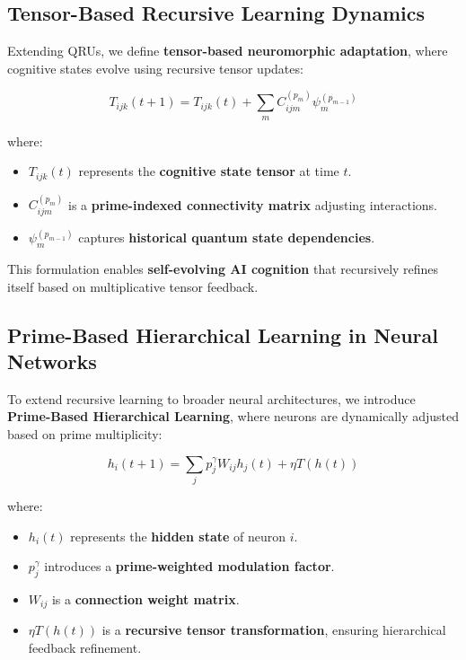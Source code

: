 \documentclass{article}
\theoremstyle{plain}
\theoremstyle{plain}
\theoremstyle{definition}
\theoremstyle{remark}
\begin{document}
\subsection{Tensor-Based Recursive Learning Dynamics}

Extending QRUs, we define \textbf{tensor-based neuromorphic adaptation}, where cognitive states evolve using recursive tensor updates:

\begin{equation}
T_{ijk}(t+1) = T_{ijk}(t) + \sum_{m} C_{ijm}^{(p_m)} \psi_m^{(p_{m-1})}
\end{equation}

where:
\begin{itemize}
    \item $T_{ijk}(t)$ represents the \textbf{cognitive state tensor} at time $t$.
    \item $C_{ijm}^{(p_m)}$ is a \textbf{prime-indexed connectivity matrix} adjusting interactions.
    \item $\psi_m^{(p_{m-1})}$ captures \textbf{historical quantum state dependencies}.
\end{itemize}

This formulation enables \textbf{self-evolving AI cognition} that recursively refines itself based on multiplicative tensor feedback.

\subsection{Prime-Based Hierarchical Learning in Neural Networks}

To extend recursive learning to broader neural architectures, we introduce \textbf{Prime-Based Hierarchical Learning}, where neurons are dynamically adjusted based on prime multiplicity:

\begin{equation}
h_i (t+1) = \sum_{j} p_j^{\gamma} W_{ij} h_j (t) + \eta T(h(t))
\end{equation}

where:
\begin{itemize}
    \item $h_i (t)$ represents the \textbf{hidden state} of neuron $i$.
    \item $p_j^{\gamma}$ introduces a \textbf{prime-weighted modulation factor}.
    \item $W_{ij}$ is a \textbf{connection weight matrix}.
    \item $\eta T(h(t))$ is a \textbf{recursive tensor transformation}, ensuring hierarchical feedback refinement.
\end{itemize}
\end{document}
